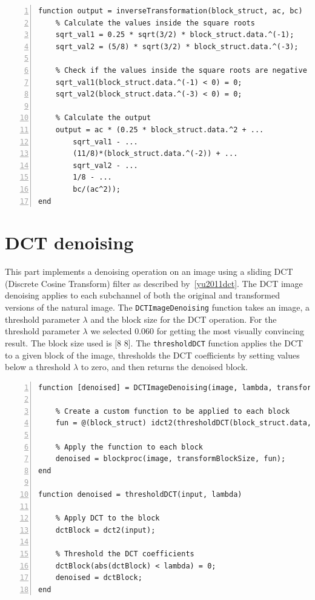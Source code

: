 \documentclass[12pt,a4paper,english
]{tunithesis}
\begin{document}
\begin{lstlisting}[style=Matlab-editor, numbers=left, basicstyle=\footnotesize]
% % 9. Inverse transformation
function output = inverseTransformation(block_struct, ac, bc)
    % Calculate the values inside the square roots
    sqrt_val1 = 0.25 * sqrt(3/2) * block_struct.data.^(-1);
    sqrt_val2 = (5/8) * sqrt(3/2) * block_struct.data.^(-3);

    % Check if the values inside the square roots are negative
    sqrt_val1(block_struct.data.^(-1) < 0) = 0;
    sqrt_val2(block_struct.data.^(-3) < 0) = 0;

    % Calculate the output
    output = ac * (0.25 * block_struct.data.^2 + ...
        sqrt_val1 - ...
        (11/8)*(block_struct.data.^(-2)) + ...
        sqrt_val2 - ...
        1/8 - ...
        bc/(ac^2));
end
\end{lstlisting}

\section{DCT denoising}
This part implements a denoising operation on an image using a sliding DCT (Discrete Cosine Transform) filter as described by~\ref{yu2011dct}. The DCT image denoising applies to each subchannel of both the original and transformed versions of the natural image. The \texttt{DCTImageDenoising} function takes an image, a threshold parameter $\lambda$ and the block size for the DCT operation. For the threshold parameter $\lambda$ we selected 0.060 for getting the most visually convincing result. The block size used is [8 8]. The \texttt{thresholdDCT} function applies the DCT to a given block of the image, thresholds the DCT coefficients by setting values below a threshold $\lambda$ to zero, and then returns the denoised block.

\begin{lstlisting}[style=Matlab-editor, numbers=left, basicstyle=\footnotesize]
function [denoised] = DCTImageDenoising(image, lambda, transformBlockSize)

    % Create a custom function to be applied to each block
    fun = @(block_struct) idct2(thresholdDCT(block_struct.data, lambda));

    % Apply the function to each block
    denoised = blockproc(image, transformBlockSize, fun);
end

function denoised = thresholdDCT(input, lambda)

    % Apply DCT to the block
    dctBlock = dct2(input);

    % Threshold the DCT coefficients
    dctBlock(abs(dctBlock) < lambda) = 0;
    denoised = dctBlock;
end
\end{lstlisting}
\end{document}
